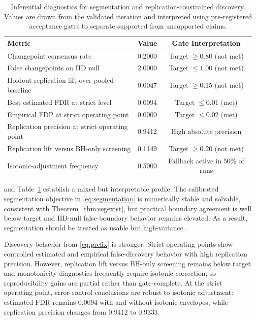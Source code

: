 \documentclass{article} %
\begin{document}
\begin{table}[t]
\caption{Inferential diagnostics for segmentation and replication-constrained discovery. Values are drawn from the validated iteration and interpreted using pre-registered acceptance gates to separate supported from unsupported claims.}
\label{tab:inferential}
\centering
\small
\renewcommand{\arraystretch}{1.1}
\setlength{\tabcolsep}{4pt}
\begin{tabular}{lcc}
\hline
Metric & Value & Gate Interpretation \\
\hline
Changepoint consensus rate & 0.2000 & Target $\ge 0.80$ (not met) \\
False changepoints on IID null & 2.0000 & Target $\le 1.00$ (not met) \\
Holdout replication lift over pooled baseline & 0.0047 & Target $\ge 0.15$ (not met) \\
Best estimated FDR at strict level & 0.0094 & Target $\le 0.01$ (met) \\
Empirical FDP at strict operating point & 0.0000 & Target $\le 0.02$ (met) \\
Replication precision at strict operating point & 0.9412 & High absolute precision \\
Replication lift versus BH-only screening & 0.1149 & Target $\ge 0.20$ (not met) \\
Isotonic-adjustment frequency & 0.5000 & Fallback active in 50\% of runs \\
\hline
\end{tabular}
\end{table}

 and Table~\ref{tab:inferential} establish a mixed but interpretable profile. The calibrated segmentation objective in \eqref{eq:segmentation} is numerically stable and solvable, consistent with Theorem~\ref{thm:segexist}, but practical boundary agreement is well below target and IID-null false-boundary behavior remains elevated. As a result, segmentation should be treated as usable but high-variance.

Discovery behavior from \eqref{eq:prefix} is stronger. Strict operating points show controlled estimated and empirical false-discovery behavior with high replication precision. However, replication lift versus BH-only screening remains below target and monotonicity diagnostics frequently require isotonic correction, so reproducibility gains are partial rather than gate-complete.
At the strict operating point, error-control conclusions are robust to isotonic adjustment: estimated FDR remains 0.0094 with and without isotonic envelopes, while replication precision changes from 0.9412 to 0.9333.
\end{document}
